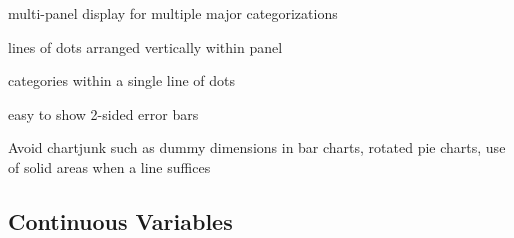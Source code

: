

  \bi
  \item multi-panel display for multiple major categorizations
  \item lines of dots arranged vertically within panel
  \item categories within a single line of dots
  \ei
 \item easy to show 2-sided error bars
 \ei
\item Avoid chartjunk such as dummy dimensions in bar charts, rotated
  pie charts, use of solid areas when a line suffices
\ei

\subsection{Continuous Variables}
